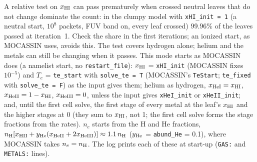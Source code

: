 \documentclass[english,a4paper]{my_memo}
\newcommand{\code}[1]{\texttt{#1}}
\begin{document}
\begin{description}
  A relative test on $x_{\rm HI}$ can pass prematurely when crossed
  neutral leaves that do not change dominate the count: in the clumpy
  model with \code{xHI\_init = 1} (a neutral start, $10^8$ packets, FUV
  band on, every leaf crossed) 99.96\% of the leaves passed at
  iteration~1.  Check the share in the first iterations; an ionized start,
  as MOCASSIN uses, avoids this.  The test covers hydrogen alone; helium
  and the metals can still be changing when it passes.  This mode
  starts as MOCASSIN does (a namelist
  start, no \code{restart\_file}): $x_{\rm HI}$ = \code{xHI\_init}
  (MOCASSIN fixes $10^{-5}$) and $T_e$ = \code{te\_start} with
  \code{solve\_te = T} (MOCASSIN's \code{TeStart}; \code{te\_fixed} with
  \code{solve\_te = F}) as the input gives them; helium as hydrogen,
  $x_{\rm HeI} = x_{\rm HI}$, $x_{\rm HeII} = 1 - x_{\rm HI}$,
  $x_{\rm HeIII} = 0$, unless the input gives \code{xHeI\_init} or
  \code{xHeII\_init}; and, until the first cell solve, the first stage of
  every metal at the leaf's $x_{\rm HI}$ and the higher stages at 0 (they
  sum to $x_{\rm HI}$, not 1; the first cell solve forms the stage
  fractions from the rates).  $n_e$ starts from the H and He fractions,
  $n_{\rm H}[x_{\rm HII} + y_{\rm He}(x_{\rm HeII} + 2x_{\rm HeIII})]
  \approx 1.1\,n_{\rm H}$ ($y_{\rm He}$ = \code{abund\_He} = 0.1), where MOCASSIN takes $n_e = n_{\rm H}$.  The
  log prints each of these at start-up (\code{GAS:} and \code{METALS:}
  lines).
\end{description}
\end{document}
